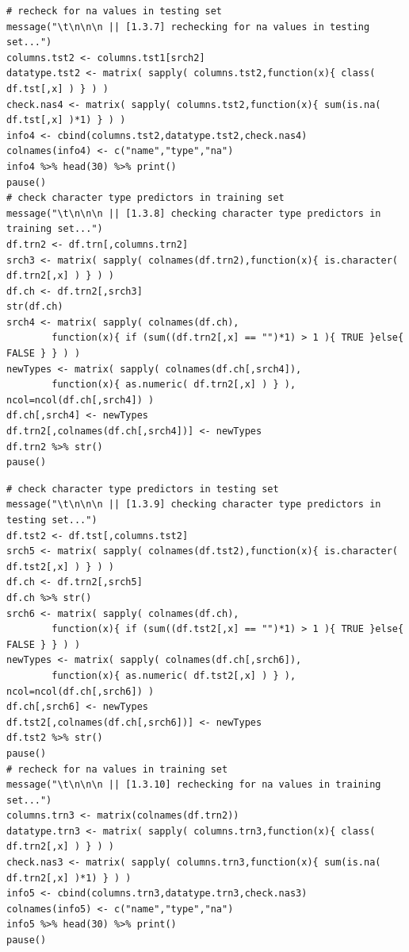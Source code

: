 \documentclass[10pt, twoside]{article}
\begin{document}
\begin{verbatim}
# recheck for na values in testing set
message("\t\n\n\n || [1.3.7] rechecking for na values in testing set...")
columns.tst2 <- columns.tst1[srch2]
datatype.tst2 <- matrix( sapply( columns.tst2,function(x){ class( df.tst[,x] ) } ) )
check.nas4 <- matrix( sapply( columns.tst2,function(x){ sum(is.na( df.tst[,x] )*1) } ) )
info4 <- cbind(columns.tst2,datatype.tst2,check.nas4)
colnames(info4) <- c("name","type","na")
info4 %>% head(30) %>% print()
pause()
# check character type predictors in training set
message("\t\n\n\n || [1.3.8] checking character type predictors in training set...")
df.trn2 <- df.trn[,columns.trn2]
srch3 <- matrix( sapply( colnames(df.trn2),function(x){ is.character( df.trn2[,x] ) } ) )
df.ch <- df.trn2[,srch3]
str(df.ch)
srch4 <- matrix( sapply( colnames(df.ch),
        function(x){ if (sum((df.trn2[,x] == "")*1) > 1 ){ TRUE }else{ FALSE } } ) )
newTypes <- matrix( sapply( colnames(df.ch[,srch4]),
        function(x){ as.numeric( df.trn2[,x] ) } ), ncol=ncol(df.ch[,srch4]) )
df.ch[,srch4] <- newTypes
df.trn2[,colnames(df.ch[,srch4])] <- newTypes
df.trn2 %>% str()
pause()
\end{verbatim}

\begin{verbatim}
# check character type predictors in testing set
message("\t\n\n\n || [1.3.9] checking character type predictors in testing set...")
df.tst2 <- df.tst[,columns.tst2]
srch5 <- matrix( sapply( colnames(df.tst2),function(x){ is.character( df.tst2[,x] ) } ) )
df.ch <- df.trn2[,srch5]
df.ch %>% str()
srch6 <- matrix( sapply( colnames(df.ch),
        function(x){ if (sum((df.tst2[,x] == "")*1) > 1 ){ TRUE }else{ FALSE } } ) )
newTypes <- matrix( sapply( colnames(df.ch[,srch6]),
        function(x){ as.numeric( df.tst2[,x] ) } ), ncol=ncol(df.ch[,srch6]) )
df.ch[,srch6] <- newTypes
df.tst2[,colnames(df.ch[,srch6])] <- newTypes
df.tst2 %>% str()
pause()
# recheck for na values in training set
message("\t\n\n\n || [1.3.10] rechecking for na values in training set...")
columns.trn3 <- matrix(colnames(df.trn2))
datatype.trn3 <- matrix( sapply( columns.trn3,function(x){ class( df.trn2[,x] ) } ) )
check.nas3 <- matrix( sapply( columns.trn3,function(x){ sum(is.na( df.trn2[,x] )*1) } ) )
info5 <- cbind(columns.trn3,datatype.trn3,check.nas3)
colnames(info5) <- c("name","type","na")
info5 %>% head(30) %>% print()
pause()
\end{verbatim}
\end{document}
